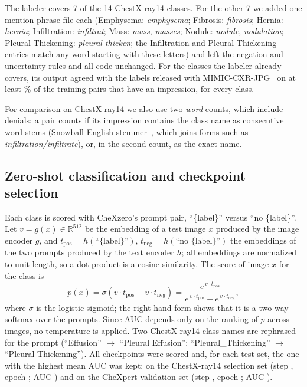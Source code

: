 \documentclass[journal]{IEEEtran}
\begin{document}
The labeler covers 7 of the 14 ChestX-ray14 classes. For the other 7 we added one mention-phrase file
each (Emphysema: \emph{emphysema}; Fibrosis: \emph{fibrosis}; Hernia: \emph{hernia}; Infiltration:
\emph{infiltrat}; Mass: \emph{mass}, \emph{masses}; Nodule: \emph{nodule}, \emph{nodulation}; Pleural
Thickening: \emph{pleural thicken}; the Infiltration and Pleural Thickening entries match any word
starting with these letters) and left the negation and uncertainty rules and all code unchanged.
For the classes the labeler already covers, its output agreed with the labels released with
MIMIC-CXR-JPG~\cite{johnson2019mimiccxrjpg} on at least \AgreeCxpMin\% of the training pairs that have an
impression, for every class.

For comparison on ChestX-ray14 we also use two \emph{word} counts, which include denials: a pair counts
if its impression contains the class name as consecutive word stems (Snowball English
stemmer~\cite{porter2001snowball}, which joins forms such as \emph{infiltration/infiltrate}), or, in the
second count, as the exact name.

\subsection{Zero-shot classification and checkpoint selection}
Each class is scored with CheXzero's prompt pair, ``\{label\}'' versus ``no \{label\}''. Let
$v=g(x)\in\mathbb{R}^{512}$ be the embedding of a test image $x$ produced by the image encoder $g$, and
$t_{\mathrm{pos}}=h(\text{``\{label\}''})$, $t_{\mathrm{neg}}=h(\text{``no \{label\}''})$ the embeddings of
the two prompts produced by the text encoder $h$; all embeddings are normalized to unit length, so a dot
product is a cosine similarity. The score of image $x$ for the class is
\begin{equation}
p(x)=\sigma\!\left(v\cdot t_{\mathrm{pos}} - v\cdot t_{\mathrm{neg}}\right)
=\frac{e^{\,v\cdot t_{\mathrm{pos}}}}{e^{\,v\cdot t_{\mathrm{pos}}}+e^{\,v\cdot t_{\mathrm{neg}}}},
\label{eq:zs}
\end{equation}
where $\sigma$ is the logistic sigmoid; the right-hand form shows that it is a two-way softmax over the
prompts. Since AUC depends only on the ranking of $p$ across images, no temperature is applied.
Two ChestX-ray14 class names are rephrased for the prompt (``Effusion'' $\rightarrow$ ``Pleural
Effusion''; ``Pleural\_Thickening'' $\rightarrow$ ``Pleural Thickening''). All \NCkpt{} checkpoints were
scored and, for each test set, the one with the highest mean AUC was kept: on the ChestX-ray14
selection set (step \BestStep, epoch \BestEpoch; AUC \SelAUC) and on the CheXpert validation set (step
\CxpBestStep, epoch \CxpBestEpoch; AUC \CxpSelAUC).
\end{document}
